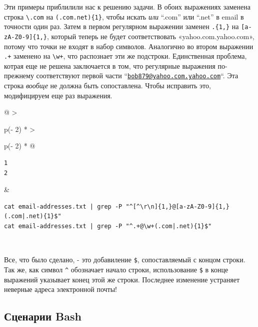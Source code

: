 \documentclass{report}
\begin{document}
Эти примеры приблилили нас к решению задачи. В обоих выражениях заменена
строка \texttt{\textbackslash{}.com} на
\texttt{(.com\textbar{}.net)\{1\}}, чтобы искать \emph{или} ``.com'' или
``.net'' в email в точности один раз. Затем в первом регулярном
выражении заменен \texttt{.\{1,\}} на \texttt{{[}a-zA-Z0-9{]}\{1,\}},
который теперь не будет соответствовать «yahoo.com.yahoo.com», потому
что точки не входят в набор символов. Аналогично во втором выражении
\texttt{.+} заменено на \texttt{\textbackslash{}w+}, что распознает эти
же подстроки. Единственная проблема, котрая еще не решена заключается в
том, что регулярные выражения по-прежнему соответствуют первой части
``\href{mailto:bob879@yahoo.com.yahoo.com}{\nolinkurl{bob879@yahoo.com.yahoo.com}}``.
Эта строка \emph{вообще} не должна быть сопоставлена. Чтобы исправить
это, модифицируем еще раз выражения.

\begin{longtable}[]{@{}
  >{\raggedright\arraybackslash}p{(\columnwidth - 2\tabcolsep) * }
  >{\raggedright\arraybackslash}p{(\columnwidth - 2\tabcolsep) * }@{}}
\toprule
\endhead
\begin{minipage}[t]{\linewidth}\raggedright
\begin{verbatim}
1
2
\end{verbatim}
\end{minipage} & \begin{minipage}[t]{\linewidth}\raggedright
\begin{verbatim}
cat email-addresses.txt | grep -P "^[^\r\n]{1,}@[a-zA-Z0-9]{1,}(.com|.net){1}$"
cat email-addresses.txt | grep -P "^.+@\w+(.com|.net){1}$"
\end{verbatim}
\end{minipage} \\ \addlinespace
\bottomrule
\end{longtable}

Все, что было сделано, - это добавиление \texttt{\$}, сопоставляемый с
концом строки. Так же, как символ \texttt{\^{}} обозначает начало
строки, использование \texttt{\$} в конце выражений указывает конец этой
же строки. Последнее изменение устраняет неверные адреса электронной
почты!

\hypertarget{Bash-Scripting}{%
\subsection{\texorpdfstring{\protect\hyperlink{Bash-Scripting}{}Сценарии
Bash}{Сценарии Bash}}\label{Bash-Scripting}}
\end{document}
